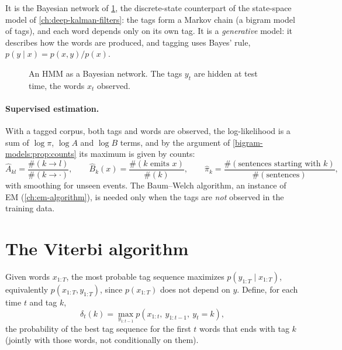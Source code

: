 \begin{notechapter}
It is the Bayesian network of \cref{hmm-viterbi:fig:hmm}, the discrete-state counterpart of the
state-space model of \cref{ch:deep-kalman-filters}: the tags form a Markov chain (a bigram model of
tags), and each word depends only on its own tag. It is a \emph{generative} model: it describes how
the words are produced, and tagging uses Bayes' rule, $p(y\mid x) = p(x, y)/p(x)$.

\begin{figure}[ht]
\centering
{}
\caption{An HMM as a Bayesian network. The tags $y_t$ are hidden at test time, the words $x_t$ observed.}
\label{hmm-viterbi:fig:hmm}
\end{figure}

\paragraph{Supervised estimation.} With a tagged corpus, both tags and words are observed, the
log-likelihood is a sum of $\log\pi$, $\log A$ and $\log B$ terms, and by the argument of
\cref{bigram-models:prop:counts} its maximum is given by counts:
\[
  \hat A_{kl} = \frac{\#(k\to l)}{\#(k\to\cdot)},\qquad\hat B_k(x) = \frac{\#(k\text{ emits }x)}{\#(k)},\qquad\hat\pi_k = \frac{\#(\text{sentences starting with }k)}{\#(\text{sentences})},
\]
with smoothing for unseen events. The Baum--Welch algorithm, an instance of EM
(\cref{ch:em-algorithm}), is needed only when the tags are \emph{not} observed in the training data.

\section{The Viterbi algorithm}\label{hmm-viterbi:sec:viterbi}

Given words $x_{1:T}$, the most probable tag sequence maximizes $p(y_{1:T}\mid x_{1:T})$, equivalently $p(x_{1:T}, y_{1:T})$, since $p(x_{1:T})$ does
not depend on $y$. Define, for each time $t$ and tag $k$,
\[
  \delta_t(k) = \max_{y_{1:t-1}}p(x_{1:t},\ y_{1:t-1},\ y_t = k),
\]
the probability of the best tag sequence for the first $t$ words that ends with tag $k$ (jointly with
those words, not conditionally on them).


\end{notechapter}
